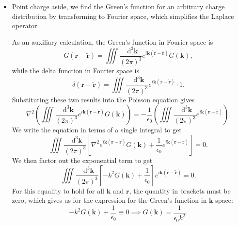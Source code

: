 \documentclass[11pt, a4paper]{article}
\newcommand{\diff}{\mathop{}\!\mathrm{d}} %
\newcommand{\dk}{\diff^{3} \vec{k}}  %
\renewcommand{\vec}[1]{\bm{#1}} %
\renewcommand{\t}[1]{\tilde{#1}} %
\renewcommand{\r}{\vec{r}}
\renewcommand{\k}{\vec{k}}
\newcommand{\ee}{\epsilon_{0}}  %
\renewcommand{\laplacian}{\nabla^{2}}
\begin{document}
\begin{itemize}
	\item Point charge aside, we find the Green's function for an arbitrary charge distribution by transforming to Fourier space, which simplifies the Laplace operator. 
	
	As an auxiliary calculation, the Green's function in Fourier space is
	\begin{equation*}
		G(\r - \t{\r}) = \iiint \frac{\dk}{(2\pi)^{3}}e^{i\k(\r - \t{\r})}G(\k),
	\end{equation*}
	while the delta function in Fourier space is
	\begin{equation*}
		\delta(\r - \t{\r}) = \iiint \frac{\dk}{(2\pi)^{3}}e^{i\k(\r - \t{\r})}\cdot 1.
	\end{equation*}
	Substituting these two results into the Poisson equation gives
	\begin{equation*}
		\laplacian \left(\iiint \frac{\dk}{(2\pi)^{3}} e^{i\k(\r - \t{\r})} G(\k)\right) = -\frac{1}{\ee} \left(\iiint \frac{\dk}{(2\pi)^{3}}e^{i\k(\r - \t{\r})} \right).
	\end{equation*}
	We write the equation in terms of a single integral to get
	\begin{equation*}
		\iiint \frac{\dk}{(2\pi)^{3}} \left[\laplacian e^{i\k(\r - \t{\r})}G(\k) + \frac{1}{\ee}e^{i\k(\r - \t{\r})}\right] = 0.
	\end{equation*}
	We then factor out the exponential term to get
	\begin{equation*}
		\iiint \frac{\dk}{(2\pi)^{3}} \left[-k^{2} G(\k) + \frac{1}{\ee}\right]e^{i\k(\r - \t{\r})} = 0.
	\end{equation*}
	For this equality to hold for all $ \k $ and $ \r $, the quantity in brackets must be zero, which gives us for the expression for the Green's function in $ \k $ space:
	\begin{equation*}
		-k^{2} G(\k) + \frac{1}{\ee} \equiv 0 \implies G(\k) = \frac{1}{\ee k^{2}}.
	\end{equation*}
	

\end{itemize}
\end{document}
